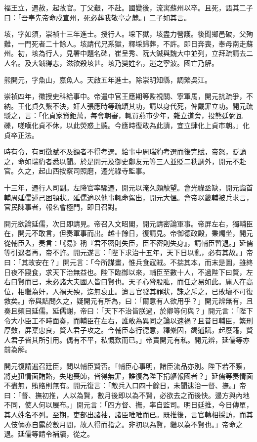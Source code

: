 \begin{pinyinscope}
福王立，遇赦，起故官。丁父艱，不赴。國變後，流寓蘇州以卒。且死，語其二子曰：「吾奉先帝命戍宣州，死必葬我敬亭之麓。」二子如其言。

垓，字如須，崇禎十三年進士。授行人。埰下獄，垓盡力營護。後聞鄉邑破，父殉難，一門死者二十餘人。垓請代兄系獄，釋埰歸葬，不許。即日奔喪，奉母南走蘇州。初，垓為行人，見署中題名碑，崔呈秀、阮大鋮與魏大中並列，立拜疏請去二人名。及大鋮得志，滋欲殺垓甚。垓乃變姓名，逃之寧波。國亡乃解。

熊開元，字魚山，嘉魚人。天啟五年進士。除崇明知縣，調繁吳江。

崇禎四年，徵授吏科給事中。帝遣中官王應期等監視關、寧軍馬，開元抗疏爭，不納。王化貞久繫不決，奸人張應時等疏頌其功，請以身代死，俾戴罪立功。開元疏駁之，言：「化貞家貲鉅萬，每會朝審，輒買燕市少年，雜立道旁，投熊廷弼瓦礫，嗟嘆化貞不休，以此熒惑上聽。今應時復敢為此請，宜立肆化上貞市朝。」化貞卒正法。

時有令，有司徵賦不及額者不得考選。給事中周瑞豹考選而後完賦，帝怒，貶謫之，命如瑞豹者悉以聞。於是開元及御史鄭友元等三人並貶二秩調外，開元不赴官。久之，起山西按察司照磨，遷光祿寺監事。

十三年，遷行人司副。左降官率驟遷，開元以淹久頗觖望。會光祿丞缺，開元詣首輔周延儒述己困頓狀。延儒適以他事輒命駕出，開元大慍。會帝以畿輔被兵求言，官民陳事者，報名會極門，即日召對。

開元欲論延儒，次日即請見。帝召入文昭閣，開元請密論軍事。帝屏左右，獨輔臣在，開元不敢言，但奏軍事而出。越十餘日，復請見。帝御德政殿，秉燭坐，開元從輔臣入，奏言：「《易》稱『君不密則失臣，臣不密則失身』，請輔臣暫退。」延儒等引退者再，帝不許。開元遂言：「陛下求治十五年，天下日以亂，必有其故。」帝曰：「其故安在？」開元言：「今所謀畫，惟兵食寇賊。不揣其本，而末是圖，雖終日夜不寢食，求天下治無益也。陛下臨御以來，輔臣至數十人，不過陛下曰賢，左右曰賢而已，未必諸大夫國人皆曰賢也。天子心膂股肱，而任之易如此。庸人在高位，相繼為奸，人禍天殃，迄無衰止。迨言官發其罪狀，誅之斥之，已敗壞不可復救矣。」帝與詰問久之，疑開元有所為，曰：「爾意有人欲用乎？」開元辨無有，且奏且頻目延儒。延儒謝，帝曰：「天下不治皆朕過，於卿等何與？」開元言：「陛下令大小臣工不時面奏，而輔臣在左右，誰敢為異同之論以速禍？且昔日輔臣，繁刑厚斂，屏棄忠良，賢人君子攻之。今輔臣奉行德意，釋纍囚，蠲逋賦，起廢籍，賢人君子皆其所引用。偶有不平，私慨歎而已。」帝責開元有私。開元辨，延儒等亦前為解。

開元復請遍召廷臣，問以輔臣賢否。「輔臣心事明，諸臣流品亦別。陛下若不察，將吏狃情面賄賂，失地喪師，皆得無罪，誰復為陛下捐軀報國者？」延儒等奏情面不盡無，賄賂則無有。開元復言：「敵兵入口四十餘日，未聞逮治一督、撫。」帝曰：「督、撫初推，人以為賢，數月後即以為不賢，必欲去之而後快。邊方與內地不同，使人何以展布。」開元言：「四方督、撫，率自監司。明日廷推，今日傳單，其人姓名不列。至期，吏部出諸袖，諸臣唯唯而已。既推後，言官轉相採訪，而其人伎倆亦自露於數月間，故人得而指之。非初以為賢，繼以為不賢也。」帝命之退。延儒等請令補牘，從之。


\end{pinyinscope}
